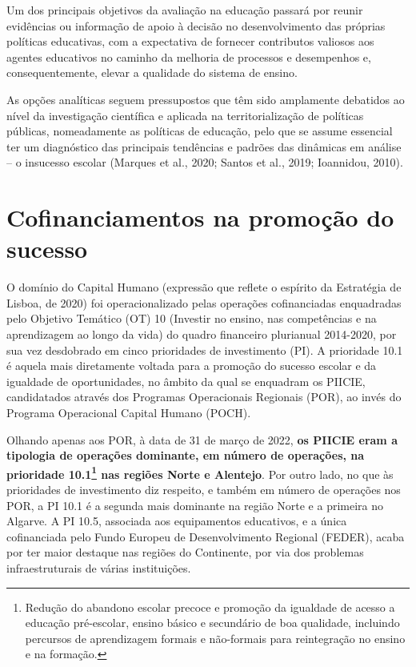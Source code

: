 \documentclass[
]{book}
\begin{document}
Um dos principais objetivos da avaliação na educação passará por reunir evidências ou informação de apoio à decisão no desenvolvimento das próprias políticas educativas, com a expectativa de fornecer contributos valiosos aos agentes educativos no caminho da melhoria de processos e desempenhos e, consequentemente, elevar a qualidade do sistema de ensino.

As opções analíticas seguem pressupostos que têm sido amplamente debatidos ao nível da investigação científica e aplicada na territorialização de políticas públicas, nomeadamente as políticas de educação, pelo que se assume essencial ter um diagnóstico das principais tendências e padrões das dinâmicas em análise -- o insucesso escolar (Marques et al., 2020; Santos et al., 2019; Ioannidou, 2010).

\hypertarget{cofinanciamentos-na-promouxe7uxe3o-do-sucesso}{%
\section{\texorpdfstring{\textbf{Cofinanciamentos na promoção do sucesso}}{Cofinanciamentos na promoção do sucesso}}\label{cofinanciamentos-na-promouxe7uxe3o-do-sucesso}}

O domínio do Capital Humano (expressão que reflete o espírito da Estratégia de Lisboa, de 2020) foi operacionalizado pelas operações cofinanciadas enquadradas pelo Objetivo Temático (OT) 10 (Investir no ensino, nas competências e na aprendizagem ao longo da vida) do quadro financeiro plurianual 2014-2020, por sua vez desdobrado em cinco prioridades de investimento (PI). A prioridade 10.1 é aquela mais diretamente voltada para a promoção do sucesso escolar e da igualdade de oportunidades, no âmbito da qual se enquadram os PIICIE, candidatados através dos Programas Operacionais Regionais (POR), ao invés do Programa Operacional Capital Humano (POCH).

Olhando apenas aos POR, à data de 31 de março de 2022, \textbf{os PIICIE eram a tipologia de operações dominante, em número de operações, na prioridade 10.1\footnote{Redução do abandono escolar precoce e promoção da igualdade de acesso a educação pré-escolar, ensino básico e secundário de boa qualidade, incluindo percursos de aprendizagem formais e não-formais para reintegração no ensino e na formação.} nas regiões Norte e Alentejo}. Por outro lado, no que às prioridades de investimento diz respeito, e também em número de operações nos POR, a PI 10.1 é a segunda mais dominante na região Norte e a primeira no Algarve. A PI 10.5, associada aos equipamentos educativos, e a única cofinanciada pelo Fundo Europeu de Desenvolvimento Regional (FEDER), acaba por ter maior destaque nas regiões do Continente, por via dos problemas infraestruturais de várias instituições.
\end{document}
